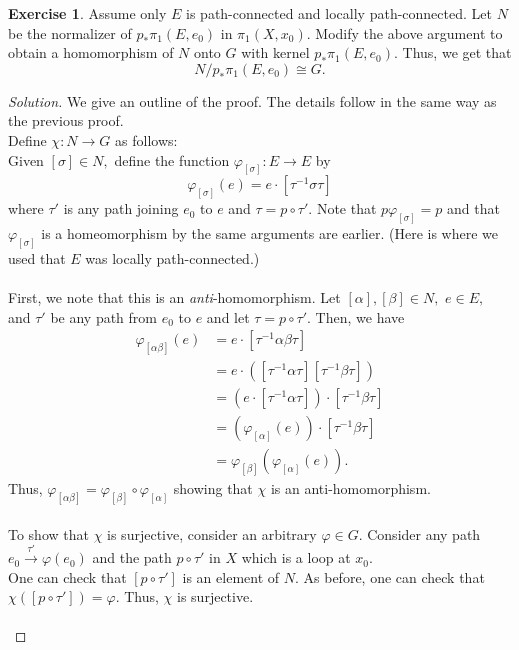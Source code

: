 \documentclass[12pt]{article}
\theoremstyle{definition}
\numberwithin{thm}{section}
\newtheorem{exe}[thm]{Exercise}
\newenvironment{soln}{\begin{proof}[Solution]}{\end{proof}}
\begin{document}
\begin{exe}
	Assume only $E$ is path-connected and locally path-connected. Let $N$ be the normalizer of $p_*\pi_1(E, e_0)$ in $\pi_1(X, x_0).$ Modify the above argument to obtain a homomorphism of $N$ onto $G$ with kernel $p_*\pi_1(E, e_0).$ Thus, we get that
	\begin{equation*} 
		N/p_*\pi_1(E, e_0) \cong G.
	\end{equation*}
\end{exe}
\begin{soln}
	We give an outline of the proof. The details follow in the same way as the previous proof. \\
	Define $\chi:N \to G$ as follows:\\
	Given $[\sigma] \in N,$ define the function $\varphi_{[\sigma]}:E \to E$ by
	\begin{equation*} 
		\varphi_{[\sigma]}(e) = e\cdot[\tau^{-1}\sigma\tau]
	\end{equation*}
	where $\tau'$ is any path joining $e_0$ to $e$ and $\tau = p \circ \tau'.$ Note that $p\varphi_{[\sigma]} = p$ and that $\varphi_{[\sigma]}$ is a homeomorphism by the same arguments are earlier. (Here is where we used that $E$ was locally path-connected.) \\~\\
	First, we note that this is an \emph{anti}-homomorphism. Let $[\alpha], [\beta] \in N,$ $e \in E,$ and $\tau'$ be any path from $e_0$ to $e$ and let $\tau = p\circ\tau'.$ Then, we have
	\begin{align*} 
		\varphi_{[\alpha\beta]}(e) &= e\cdot[\tau^{-1}\alpha\beta\tau]\\
		&=e\cdot\left([\tau^{-1}\alpha\tau][\tau^{-1}\beta\tau]\right)\\
		&= (e\cdot[\tau^{-1}\alpha\tau])\cdot[\tau^{-1}\beta\tau]\\
		&= (\varphi_{[\alpha]}(e))\cdot[\tau^{-1}\beta\tau]\\
		&= \varphi_{[\beta]}(\varphi_{[\alpha]}(e)).
	\end{align*}
	Thus, $\varphi_{[\alpha\beta]} = \varphi_{[\beta]}\circ\varphi_{[\alpha]}$ showing that $\chi$ is an anti-homomorphism.\\~\\
	To show that $\chi$ is surjective, consider an arbitrary $\varphi \in G.$ Consider any path $e_0\overset{\tau'}{\longrightarrow}\varphi(e_0)$ and the path $p\circ\tau'$ in $X$ which is a loop at $x_0.$\\
	One can check that $[p\circ\tau']$ is an element of $N.$ As before, one can check that $\chi([p\circ\tau']) = \varphi.$ Thus, $\chi$ is surjective.\\~\\

\end{soln}
\end{document}
